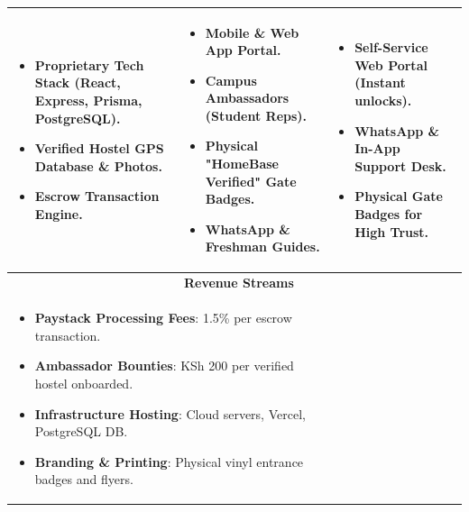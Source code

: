 \documentclass[11pt,a4paper]{article}
\begin{document}
\begin{tabularx}{\textwidth}{|X|X|X|}
\hline
\begin{minipage}[t]{\linewidth}\raggedright
\begin{itemize}[leftmargin=*,noitemsep,topsep=2pt,parsep=2pt]
    \item Proprietary Tech Stack (React, Express, Prisma, PostgreSQL).
    \item Verified Hostel GPS Database \& Photos.
    \item Escrow Transaction Engine.
\end{itemize}
\end{minipage}
&
\begin{minipage}[t]{\linewidth}\raggedright
\begin{itemize}[leftmargin=*,noitemsep,topsep=2pt,parsep=2pt]
    \item Mobile \& Web App Portal.
    \item Campus Ambassadors (Student Reps).
    \item Physical "HomeBase Verified" Gate Badges.
    \item WhatsApp \& Freshman Guides.
\end{itemize}
\end{minipage}
&
\begin{minipage}[t]{\linewidth}\raggedright
\begin{itemize}[leftmargin=*,noitemsep,topsep=2pt,parsep=2pt]
    \item Self-Service Web Portal (Instant unlocks).
    \item WhatsApp \& In-App Support Desk.
    \item Physical Gate Badges for High Trust.
\end{itemize}
\end{minipage}
\\
\hline
\rowcolor{lightgray}
\multicolumn{2}{|l|}{\textbf{Cost Structure}} & \textbf{Revenue Streams} \\
\hline
\multicolumn{2}{|X|}{
\begin{minipage}[t]{\linewidth}\raggedright
\begin{itemize}[leftmargin=*,noitemsep,topsep=2pt,parsep=2pt]
    \item \textbf{Paystack Processing Fees}: 1.5\% per escrow transaction.
    \item \textbf{Ambassador Bounties}: KSh 200 per verified hostel onboarded.
    \item \textbf{Infrastructure Hosting}: Cloud servers, Vercel, PostgreSQL DB.
    \item \textbf{Branding \& Printing}: Physical vinyl entrance badges and flyers.

\end{itemize}
\end{minipage}}
\end{tabularx}
\end{document}
